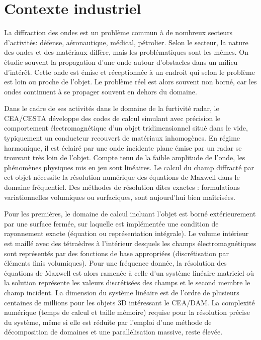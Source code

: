\section*{Contexte industriel}
La diffraction des ondes est un problème commun à de nombreux secteurs d'activités: défense, aéronautique, médical, pétrolier.
Selon le secteur, la nature des ondes et des matériaux diffère, mais les problématiques sont les mêmes.
On étudie souvent la propagation d'une onde autour d'obstacles dans un milieu d’intérêt.
Cette onde est émise et réceptionnée à un endroit qui selon le problème est loin ou proche de l'objet.
Le problème réel est alors souvent non borné, car les ondes continuent à se propager souvent en dehors du domaine.

Dans le cadre de ses activités dans le domaine de la furtivité radar, le CEA/CESTA développe des codes de calcul simulant avec précision le comportement électromagnétique d’un objet tridimensionnel situé dans le vide, typiquement un conducteur recouvert de matériaux inhomogènes.
En régime harmonique, il est éclairé par une onde incidente plane émise par un radar se trouvant très loin de l’objet.
Compte tenu de la faible amplitude de l’onde, les phénomènes physiques mis en jeu sont linéaires.
Le calcul du champ diffracté par cet objet nécessite la résolution numérique des équations de Maxwell dans le domaine fréquentiel.
Des méthodes de résolution dites exactes : formulations variationnelles volumiques ou surfaciques, sont aujourd’hui bien maîtrisées.

Pour les premières, le domaine de calcul incluant l’objet est borné extérieurement par une surface fermée, sur laquelle est implémentée une condition de rayonnement exacte (équation ou représentation intégrale).
Le volume intérieur est maillé avec des tétraèdres à l’intérieur desquels les champs électromagnétiques sont représentés par des fonctions de base appropriées (discrétisation par éléments finis volumiques).
Pour une fréquence donnée, la résolution des équations de Maxwell est alors ramenée à celle d’un système linéaire matriciel où la solution représente les valeurs discrétisées des champs et le second membre le champ incident.
La dimension du système linéaire est de l’ordre de plusieurs centaines de millions pour les objets 3D intéressant le CEA/DAM.
La complexité numérique (temps de calcul et taille mémoire) requise pour la résolution précise du système, même si elle est réduite par l'emploi d'une méthode de décomposition de domaines et une parallélisation massive, reste élevée.

